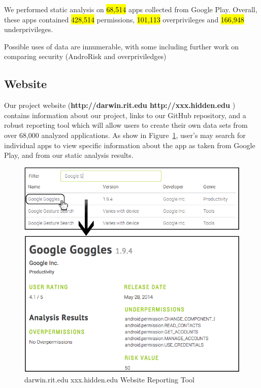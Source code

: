 

We performed static analysis on \hl{68,514} apps collected from Google Play. Overall, these apps contained \hl{428,514} permissions, \hl{101,113} overprivileges and \hl{166,948} underprivileges.


Possible uses of data are innumerable, with some including further work on comparing security (AndroRisk and overpriviledges)



\subsection{Website}


Our project website (\textbf{\ifisnopii http://darwin.rit.edu \else http://xxx.hidden.edu \fi}) contains information about our project, links to our GitHub repository, and a robust reporting tool which will allow users to create their own data sets from over 68,000 analyzed applications. As show in Figure~\ref{fig:website1}, user's may search for individual apps to view specific information about the app as taken from Google Play, and from our static analysis results.

 \begin{figure}[ht!]
\centering
\includegraphics[width=\columnwidth, angle = 0]{images/screenshot3.png}
\caption{\ifisnopii darwin.rit.edu \else xxx.hidden.edu \fi Website Reporting Tool}
\label{fig:website1}
\end{figure}


